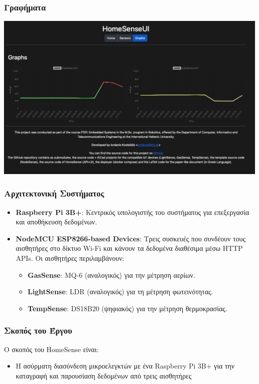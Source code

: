 \documentclass{beamer}
\begin{document}
\begin{frame}
\frametitle{Γραφήματα}
	\centerline{\includegraphics[width=1\textwidth]{assets/graphs-html}}
\end{frame}

\begin{frame}
\frametitle{Αρχιτεκτονική Συστήματος}
\begin{itemize}
    \item \textbf{Raspberry Pi 3B+}: Κεντρικός υπολογιστής του συστήματος για επεξεργασία και αποθήκευση δεδομένων.
    \item \textbf{NodeMCU ESP8266-based Devices}: Τρεις συσκευές που συνδέουν τους αισθητήρες στο δίκτυο Wi-Fi και κάνουν τα δεδομένα διαθέσιμα μέσω HTTP APIs. Οι αισθητήρες περιλαμβάνουν:
    \begin{itemize}
        \item \textbf{GasSense}: MQ-6 (αναλογικός) για την μέτρηση αερίων.
        \item \textbf{LightSense}: LDR (αναλογικός) για τη μέτρηση φωτεινότητας.
        \item \textbf{TempSense}: DS18B20 (ψηφιακός) για την μέτρηση θερμοκρασίας.
    \end{itemize}
\end{itemize}
\end{frame}

\begin{frame}
\frametitle{Σκοπός του Έργου}
Ο σκοπός του HomeSense είναι:
\begin{itemize}
    \item Η ασύρματη διασύνδεση μικροελεγκτών με ένα Raspberry Pi 3B+ για την καταγραφή και παρουσίαση δεδομένων από τρεις αισθητήρες  
\end{itemize}
\end{frame}
\end{document}
